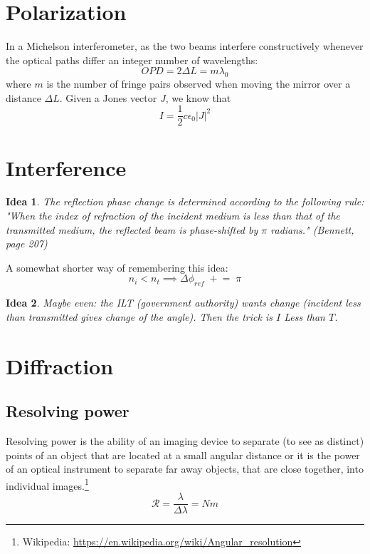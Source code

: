\documentclass{article}
\newtheorem*{idea}{Idea}
\begin{document}
\section{Polarization}
\noindent{}In a Michelson interferometer, as the two beams interfere constructively whenever the optical paths differ an integer number of wavelengths: $$OPD=2\Delta L = m \lambda_0$$
where $m$ is the number of fringe pairs observed when moving the mirror over a distance $\Delta L$.
\newline\newline
Given a Jones vector $J$, we know that
\begin{equation}
    I=\frac{1}{2} c \epsilon_0 \left|J\right|^2
\end{equation}
\iffalse
\noindent
A wave plate is defined to change the polarization state of a wave passing through it.
This means that the definition of a half-wave plate, for example, is that it changes the polarization angle of the light along the slow axis by $\pi$.
The definition \textbf{does not} state that a delay of $\frac{1}{2}\lambda$ is induced along the slow axis (although this is usually the case (especially, the plate does not induce a delay of $\frac{1}{2}\lambda_0$).
\fi
\section{Interference}
\begin{idea}
The reflection phase change is determined according to the following rule:
"When the index of refraction of the incident medium is less than that of the transmitted medium, the reflected beam is phase-shifted by $\pi$ radians." (Bennett, page 207)
\end{idea}
\noindent{}A somewhat shorter way of remembering this idea:
$$n_i<n_t\implies \Delta\phi_{ref} \; + \! = \; \pi$$
\begin{idea}
Maybe even: the ILT (government authority) wants change (incident less than transmitted gives change of the angle).
Then the trick is $I$ Less than $T$.
\end{idea}
\section{Diffraction}
\subsection{Resolving power}
Resolving power is the ability of an imaging device to separate (to see as distinct) points of an object that are located at a small angular distance or it is the power of an optical instrument to separate far away objects, that are close together, into individual images.\footnote{Wikipedia: \url{https://en.wikipedia.org/wiki/Angular_resolution}}
$$\mathcal{R}=\frac{\lambda}{\Delta\lambda}=Nm$$
\end{document}
